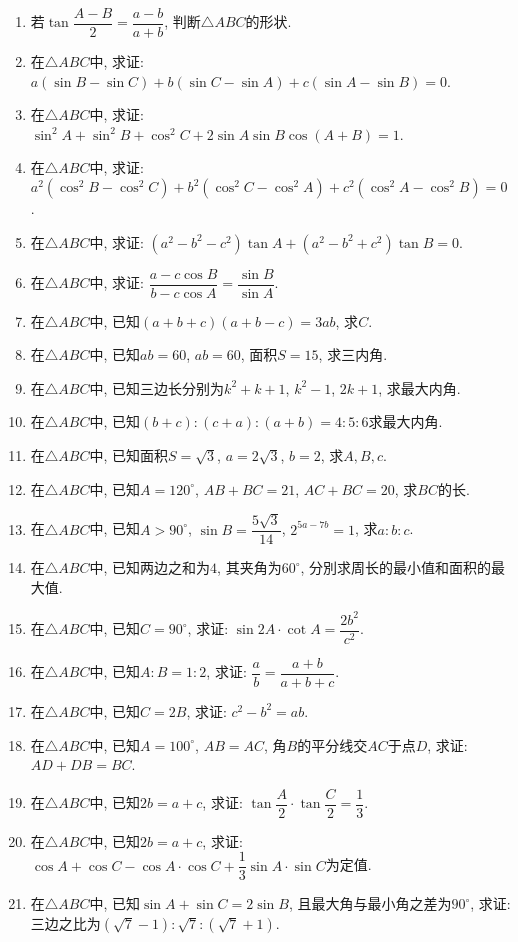 \documentclass[10pt,a4paper]{article}
\begin{document}
\begin{enumerate}[1.]
\item 若$\tan \dfrac{A-B}2=\dfrac {a-b}{a+b}$, 判断$\triangle ABC$的形状.
\item 在$\triangle ABC$中, 求证: $a(\sin B-\sin C)+b(\sin C-\sin A)+c(\sin A-\sin B)=0$.
\item 在$\triangle ABC$中, 求证: $\sin ^2A+\sin ^2B+\cos ^2C+2\sin A\sin B\cos (A+B)=1$.
\item 在$\triangle ABC$中, 求证: $a^2(\cos ^2B-\cos ^2C)+b^2(\cos ^2C-\cos ^2A)+c^2(\cos ^2A-\cos ^2B)=0$.
\item 在$\triangle ABC$中, 求证: $(a^2-b^2-c^2)\tan A+(a^2-b^2+c^2)\tan B=0$.
\item 在$\triangle ABC$中, 求证: $\dfrac{a-c\cos B}{b-c\cos A}=\dfrac{\sin B}{\sin A}$.
\item 在$\triangle ABC$中, 已知$(a+b+c)(a+b-c)=3ab$, 求$C$.
\item 在$\triangle ABC$中, 已知$ab=60$, $ab=60$, 面积$S=15$, 求三内角.
\item 在$\triangle ABC$中, 已知三边长分别为$k^2+k+1$, $k^2-1$, $2k+1$, 求最大内角.
\item 在$\triangle ABC$中, 已知$(b+c):(c+a):(a+b)=4:5:6$求最大内角.
\item 在$\triangle ABC$中, 已知面积$S=\sqrt 3$, $a=2\sqrt 3$, $b=2$, 求$A,B,c$.
\item 在$\triangle ABC$中, 已知$A=120^\circ$, $AB+BC=21$, $AC+BC=20$, 求$BC$的长.
\item 在$\triangle ABC$中, 已知$A>90^{\circ}$, $\sin B=\dfrac{5\sqrt 3}{14}$, $2^{5a-7b}=1$, 求$a:b:c$.
\item 在$\triangle ABC$中, 已知两边之和为$4$, 其夹角为$60^\circ$, 分別求周长的最小值和面积的最大值.
\item 在$\triangle ABC$中, 已知$C=90^{\circ}$, 求证: $\sin 2A\cdot \cot A=\dfrac{2b^2}{c^2}$.
\item 在$\triangle ABC$中, 已知$A:B=1:2$, 求证: $\dfrac ab=\dfrac{a+b}{a+b+c}$.
\item 在$\triangle ABC$中, 已知$C=2B$, 求证: $c^2-b^2=ab$.
\item 在$\triangle ABC$中, 已知$A=100^\circ$, $AB=AC$, 角$B$的平分线交$AC$于点$D$, 求证: $AD+DB=BC$.
\item 在$\triangle ABC$中, 已知$2b=a+c$, 求证:
$\tan \dfrac A2\cdot \tan \dfrac C2=\dfrac 13$.
\item 在$\triangle ABC$中, 已知$2b=a+c$, 求证: $\cos A+\cos C-\cos A\cdot \cos C+\dfrac 13\sin A\cdot \sin C$为定值.
\item 在$\triangle ABC$中, 已知$\sin A+\sin C=2\sin B$, 且最大角与最小角之差为$90^\circ$, 求证: 三边之比为$(\sqrt 7-1):\sqrt 7:(\sqrt 7+1)$.

\end{enumerate}
\end{document}
